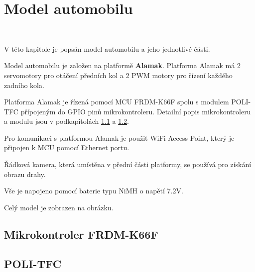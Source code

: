 \chapter{Model automobilu}
\label{sec:CarModel} \

V této kapitole je popsán model automobilu a jeho jednotlivé části.

Model automobilu je založen na platformě \textbf{Alamak}.
Platforma Alamak má 2 servomotory pro otáčení předních kol a 2 PWM motory pro řízení každého
zadního kola.

Platforma Alamak je řízená pomocí MCU FRDM-K66F\cite{frdmk66UserGuide} spolu
s modulem POLI-TFC přípojeným do GPIO pinů mikrokontroleru.
Detailní popis mikrokontroleru a modulu jsou v podkapitolách \ref{sec:FRDM-K66F} a \ref{sec:POLI-TFC}.

Pro komunikaci s platformou Alamak je použit WiFi Access Point, který je připojen k MCU
pomocí Ethernet portu.

Řádková kamera, která umístěna v přední části platformy, se používá pro získání obrazu drahy.

Vše je napojeno pomocí baterie typu NiMH o napětí 7.2V.

Celý model je zobrazen na obrázku.

\section{Mikrokontroler FRDM-K66F}
\label{sec:FRDM-K66F}

\section{POLI-TFC}
\label{sec:POLI-TFC}

\endinput
